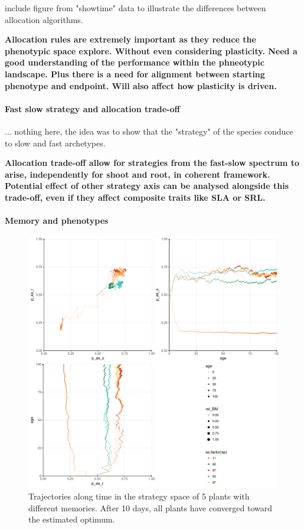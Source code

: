 include figure from "showtime" data to illustrate the differences between allocation algorithms.

\textbf{Allocation rules are extremely important as they reduce the phenotypic space explore. Without even considering plasticity. Need a good understanding of the performance within the phneotypic landscape. Plus there is a need for alignment between starting phenotype and endpoint. Will also affect how plasticity is driven.}

\paragraph{Fast slow strategy and allocation trade-off}

... nothing here, the idea was to show that the "strategy" of the species conduce to slow and fast archetypes.

\textbf{Allocation trade-off allow for strategies from the fast-slow spectrum to arise, independently for shoot and root, in coherent framework. Potential effect of other strategy axis can be analysed alongside this trade-off, even if they affect composite traits like SLA or SRL.}

\paragraph{Memory and phenotypes}


\begin{figure}\label{fig:plastic_allocation_trajectory}
\includegraphics[width = \textwidth]{./2_PP/Figures/memory_effect.pdf}
\caption{Trajectories along time in the strategy space of 5 plants with different memories. After 10 days, all plants have converged toward the estimated optimum.}
\end{figure}

